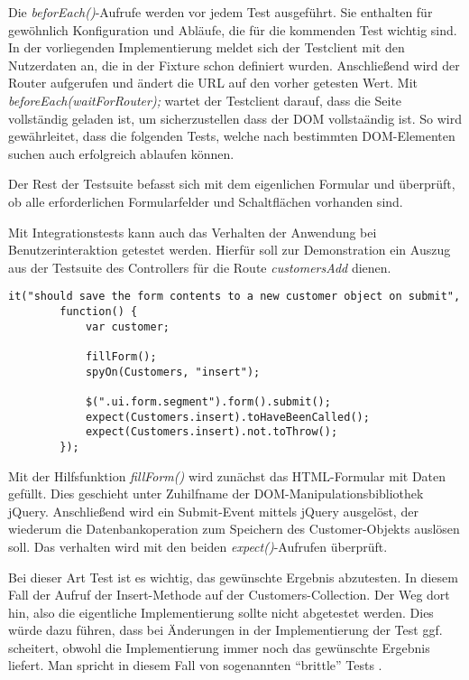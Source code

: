 Die \textit{beforEach()}-Aufrufe werden vor jedem Test ausgeführt. Sie enthalten
für gewöhnlich Konfiguration und Abläufe, die für die kommenden Test wichtig
sind. In der vorliegenden Implementierung meldet sich der Testclient mit den
Nutzerdaten an, die in der Fixture schon definiert wurden. Anschließend wird der
Router aufgerufen und ändert die URL auf den vorher getesten Wert. Mit
\textit{beforeEach(waitForRouter);} wartet der Testclient darauf, dass die Seite
vollständig geladen ist, um  sicherzustellen dass der DOM vollstaändig ist. So
wird gewährleitet, dass die folgenden Tests, welche nach bestimmten
DOM-Elementen suchen auch erfolgreich ablaufen können.

Der Rest der Testsuite befasst sich mit dem eigenlichen Formular und überprüft,
ob alle erforderlichen Formularfelder und Schaltflächen vorhanden sind.

Mit Integrationstests kann auch das Verhalten der Anwendung bei Benutzerinteraktion
getestet werden. Hierfür soll zur Demonstration ein Auszug aus der Testsuite des
Controllers für die Route \textit{customersAdd} dienen.

\begin{lstlisting}[caption=Test des Verhaltens bei Benutzereingabe]
  it("should save the form contents to a new customer object on submit",
		function() {
			var customer;

			fillForm();
			spyOn(Customers, "insert");

			$(".ui.form.segment").form().submit();
			expect(Customers.insert).toHaveBeenCalled();
			expect(Customers.insert).not.toThrow();
		});
\end{lstlisting}

Mit der Hilfsfunktion \textit{fillForm()} wird zunächst das HTML-Formular mit
Daten gefüllt. Dies geschieht unter Zuhilfname der DOM-Manipulationsbibliothek
jQuery. Anschließend wird ein Submit-Event mittels jQuery ausgelöst, der
wiederum die Datenbankoperation zum Speichern des Customer-Objekts auslösen
soll. Das verhalten wird mit den beiden \textit{expect()}-Aufrufen überprüft.

Bei dieser Art Test ist es wichtig, das gewünschte Ergebnis abzutesten. In
diesem Fall der Aufruf der Insert-Methode auf der Customers-Collection. Der Weg
dort hin, also die eigentliche Implementierung sollte nicht abgetestet werden.
Dies würde dazu führen, dass bei Änderungen in der Implementierung der Test ggf.
scheitert, obwohl die Implementierung immer noch das gewünschte Ergebnis
liefert. Man spricht in diesem Fall von sogenannten "`brittle"' Tests
\cite{brittle-tests}.

